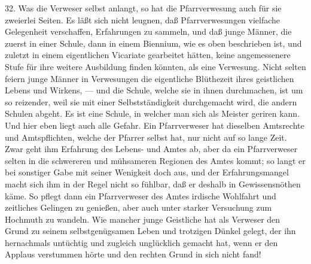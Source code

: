 32. Was die Verweser selbst anlangt, so hat die Pfarrverwesung auch für sie zweierlei Seiten. Es läßt sich nicht leugnen, daß Pfarrverwesungen vielfache Gelegenheit verschaffen, Erfahrungen zu sammeln, und daß junge Männer, die zuerst in einer Schule, dann in einem Biennium, wie es oben beschrieben ist, und zuletzt in einem eigentlichen Vicariate gearbeitet hätten, keine angemessenere Stufe für ihre weitere Ausbildung finden könnten, als eine Verwesung. Nicht selten feiern junge Männer in Verwesungen die eigentliche Blüthezeit ihres geistlichen Lebens und Wirkens, — und die Schule, welche sie in ihnen durchmachen, ist um so reizender, weil sie mit einer Selbstständigkeit durchgemacht wird, die andern Schulen abgeht. Es ist eine Schule, in welcher man sich als Meister geriren kann. Und hier eben liegt auch alle Gefahr. Ein Pfarrverweser hat dieselben Amtsrechte und Amtspflichten, welche der Pfarrer selbst hat, nur nicht auf so lange Zeit. Zwar geht ihm Erfahrung des Lebens- und Amtes ab, aber da ein Pfarrverweser selten in die schwereren und mühsameren Regionen des Amtes kommt; so langt er bei sonstiger Gabe mit seiner Wenigkeit doch aus, und der Erfahrungsmangel macht sich ihm in der Regel nicht so fühlbar, daß er deshalb in Gewissensnöthen käme. So pflegt dann ein Pfarrverweser des Amtes irdische Wohlfahrt und zeitliches Gelingen zu genießen, aber auch unter starker Versuchung zum Hochmuth zu wandeln. Wie mancher junge Geistliche hat als Verweser den Grund zu seinem selbstgenügsamen Leben und
trotzigen Dünkel gelegt, der ihn hernachmals untüchtig und zugleich unglücklich gemacht hat, wenn er den Applaus verstummen hörte und den rechten Grund in sich nicht fand!

